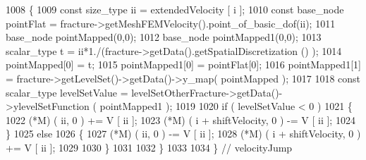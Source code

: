 \begin{DoxyCode}
1008     \{
1009         \textcolor{keyword}{const} size\_type ii = extendedVelocity [ i ];
1010         \textcolor{keyword}{const} base\_node pointFlat = fracture->getMeshFEMVelocity().point\_of\_basic\_dof(ii);
1011         base\_node pointMapped(0,0);
1012         base\_node pointMapped1(0,0);
1013     scalar\_type t = ii*1./(fracture->getData().getSpatialDiscretization () );
1014         pointMapped[0] = t;
1015         pointMapped1[0] = pointFlat[0];
1016         pointMapped1[1] = fracture->getLevelSet()->getData()->y\_map( pointMapped );
1017 
1018     \textcolor{keyword}{const} scalar\_type levelSetValue = levelSetOtherFracture->getData()->ylevelSetFunction ( pointMapped1 );
1019 
1020         \textcolor{keywordflow}{if} ( levelSetValue < 0 )
1021         \{
1022             (*M) ( ii, 0 ) += V [ ii ];
1023             (*M) ( i + shiftVelocity, 0 ) -= V [ ii ];
1024         \}
1025         \textcolor{keywordflow}{else}
1026         \{
1027             (*M) ( ii, 0 ) -= V [ ii ];
1028             (*M) ( i + shiftVelocity, 0 ) += V [ ii ];
1029 
1030         \}
1031 
1032     \}
1033 
1034 \} \textcolor{comment}{// velocityJump}
\end{DoxyCode}
